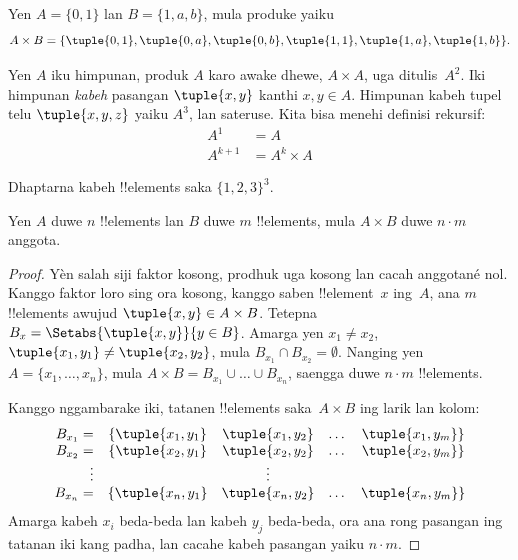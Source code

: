\documentclass[../../../include/open-logic-section]{subfiles}
\begin{document}
\begin{ex}
Yen $A = \{0, 1\}$ lan $B = \{1, a, b\}$, mula produke yaiku
\[
A \times B = \{ \tuple{0, 1}, \tuple{0, a}, \tuple{0, b},
    \tuple{1, 1}, \tuple{1, a}, \tuple{1, b} \}.
\]
\end{ex}

\begin{ex}
Yen $A$ iku himpunan, produk $A$ karo awake dhewe,
$A \times A$, uga ditulis~$A^2$. Iki himpunan
\emph{kabeh} pasangan $\tuple{x, y}$ kanthi $x, y \in A$.
Himpunan kabeh tupel telu $\tuple{x, y, z}$ yaiku $A^3$,
lan sateruse. Kita bisa menehi definisi rekursif:
\begin{align*}
  A^1 & = A\\
  A^{k+1} & = A^k \times A
\end{align*}
\end{ex}

\begin{prob}
Dhaptarna kabeh !!{element}s saka $\{1, 2, 3\}^3$.
\end{prob}

\begin{prop}
Yen $A$ duwe $n$ !!{element}s lan $B$ duwe $m$ !!{element}s,
mula $A\times B$ duwe $n\cdot m$ anggota.
\end{prop}

\begin{proof}
Yèn salah siji faktor kosong, prodhuk uga kosong lan cacah
anggotané nol. Kanggo faktor loro sing ora kosong,
kanggo saben !!{element}~$x$ ing~$A$, ana $m$ !!{element}s
awujud $\tuple{x, y} \in A \times B$.
Tetepna $B_x = \Setabs{\tuple{x, y}}{y\in B}$.
Amarga yen $x_1 \neq x_2$,
$\tuple{x_1, y_1} \neq\tuple{x_2, y_2}$, mula
$B_{x_1} \cap B_{x_2} = \emptyset$.
Nanging yen $A = \{x_1,\dots, x_n\}$, mula
$A \times B = B_{x_1} \cup \dots \cup B_{x_n}$,
saengga duwe $n\cdot m$ !!{element}s.

Kanggo nggambarake iki, tatanen !!{element}s saka~$A \times B$
ing larik lan kolom:
\[
\begin{array}{rcccc}
  B_{x_1} = & \{\tuple{x_1, y_1} & \tuple{x_1, y_2} & \dots & \tuple{x_1, y_m}\}\\
  B_{x_2} = & \{\tuple{x_2, y_1} & \tuple{x_2, y_2} & \dots & \tuple{x_2, y_m}\}\\
  \vdots & & \vdots\\
  B_{x_n} = & \{\tuple{x_n, y_1} & \tuple{x_n, y_2} & \dots & \tuple{x_n, y_m}\}
\end{array}
\]
Amarga kabeh $x_i$ beda-beda lan kabeh $y_j$ beda-beda,
ora ana rong pasangan ing tatanan iki kang padha,
lan cacahe kabeh pasangan yaiku $n\cdot m$.
\end{proof}
\end{document}

